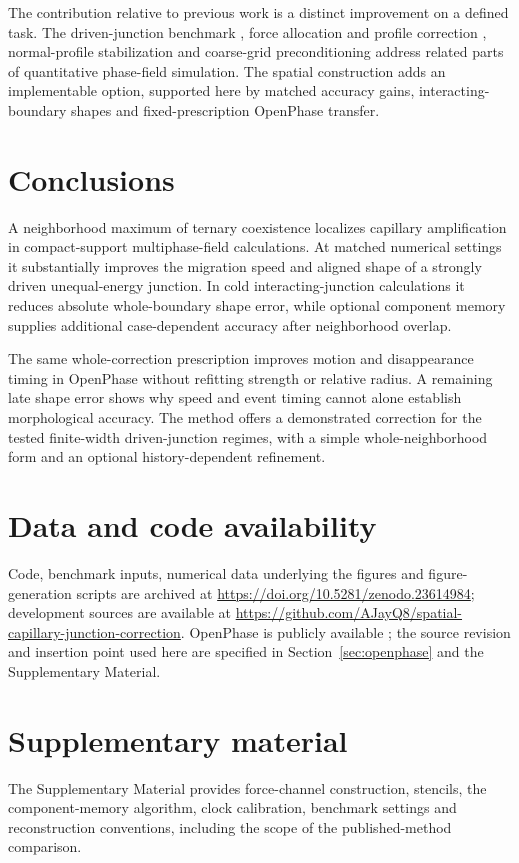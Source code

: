 The contribution relative to previous work is a distinct improvement on a defined task. The driven-junction benchmark \citep{hoffrogge2025}, force allocation and profile correction \citep{grose2022}, normal-profile stabilization \citep{feyen2023} and coarse-grid preconditioning \citep{sakane2026} address related parts of quantitative phase-field simulation. The spatial construction adds an implementable option, supported here by matched accuracy gains, interacting-boundary shapes and fixed-prescription OpenPhase transfer.

\section{Conclusions}
A neighborhood maximum of ternary coexistence localizes capillary amplification in compact-support multiphase-field calculations. At matched numerical settings it substantially improves the migration speed and aligned shape of a strongly driven unequal-energy junction. In cold interacting-junction calculations it reduces absolute whole-boundary shape error, while optional component memory supplies additional case-dependent accuracy after neighborhood overlap.

The same whole-correction prescription improves motion and disappearance timing in OpenPhase without refitting strength or relative radius. A remaining late shape error shows why speed and event timing cannot alone establish morphological accuracy. The method offers a demonstrated correction for the tested finite-width driven-junction regimes, with a simple whole-neighborhood form and an optional history-dependent refinement.

\section*{Data and code availability}
Code, benchmark inputs, numerical data underlying the figures and figure-generation scripts are archived at \url{https://doi.org/10.5281/zenodo.23614984}; development sources are available at \url{https://github.com/AJayQ8/spatial-capillary-junction-correction}. OpenPhase is publicly available \citep{openphase}; the source revision and insertion point used here are specified in Section~\ref{sec:openphase} and the Supplementary Material.

\section*{Supplementary material}
The Supplementary Material provides force-channel construction, stencils, the component-memory algorithm, clock calibration, benchmark settings and reconstruction conventions, including the scope of the published-method comparison.

